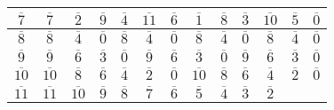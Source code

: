 \begin{solution}
\begin{center}
\begin{tabular}{|c||c|c|c|c|c|c|c|c|c|c|c|c|}
            \hline
            \( \overline{7} \) &
            \( \overline{7} \) &
            \( \overline{2} \) &
            \( \overline{9} \) &
            \( \overline{4} \) &
            \( \overline{11} \) &
            \( \overline{6} \) &
            \( \overline{1} \) &
            \( \overline{8} \) &
            \( \overline{3} \) &
            \( \overline{10} \) &
            \( \overline{5} \) &
            \( \overline{0} \) \\
            \hline
            \( \overline{8} \) &
            \( \overline{8} \) &
            \( \overline{4} \) &
            \( \overline{0} \) &
            \( \overline{8} \) &
            \( \overline{4} \) &
            \( \overline{0} \) &
            \( \overline{8} \) &
            \( \overline{4} \) &
            \( \overline{0} \) &
            \( \overline{8} \) &
            \( \overline{4} \) &
            \( \overline{0} \) \\
            \hline
            \( \overline{9} \) &
            \( \overline{9} \) &
            \( \overline{6} \) &
            \( \overline{3} \) &
            \( \overline{0} \) &
            \( \overline{9} \) &
            \( \overline{6} \) &
            \( \overline{3} \) &
            \( \overline{0} \) &
            \( \overline{9} \) &
            \( \overline{6} \) &
            \( \overline{3} \) &
            \( \overline{0} \) \\
            \hline
            \( \overline{10} \) &
            \( \overline{10} \) &
            \( \overline{8} \) &
            \( \overline{6} \) &
            \( \overline{4} \) &
            \( \overline{2} \) &
            \( \overline{0} \) &
            \( \overline{10} \) &
            \( \overline{8} \) &
            \( \overline{6} \) &
            \( \overline{4} \) &
            \( \overline{2} \) &
            \( \overline{0} \) \\
            \hline
            \( \overline{11} \) &
            \( \overline{11} \) &
            \( \overline{10} \) &
            \( \overline{9} \) &
            \( \overline{8} \) &
            \( \overline{7} \) &
            \( \overline{6} \) &
            \( \overline{5} \) &
            \( \overline{4} \) &
            \( \overline{3} \) &
            \( \overline{2} \) &

\end{tabular}
\end{center}
\end{solution}

